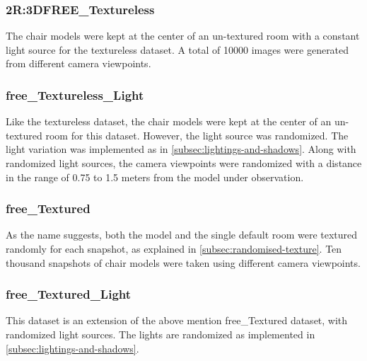 
\subsubsection{2R:3DFREE\_Textureless}

    The chair models were kept at the center of an un-textured room with a constant light source for the textureless dataset.
    A total of 10000 images were generated from different camera viewpoints.

\subsubsection{\gls{free}\_Textureless\_Light}

    Like the textureless dataset, the chair models were kept at the center of an un-textured room for this dataset.
    However, the light source was randomized.
    The light variation was implemented as in \autoref{subsec:lightings-and-shadows}.
    Along with randomized light sources, the camera viewpoints were randomized with a distance in the range of 0.75 to 1.5 meters from the model under observation.

\subsubsection{\gls{free}\_Textured}

    As the name suggests, both the model and the single default room were textured randomly for each snapshot, as explained in \autoref{subsec:randomised-texture}.
    Ten thousand snapshots of chair models were taken using different camera viewpoints.

\subsubsection{\gls{free}\_Textured\_Light}

    This dataset is an extension of the above mention \gls{free}\_Textured dataset, with randomized light sources.
    The lights are randomized as implemented in \autoref{subsec:lightings-and-shadows}.

